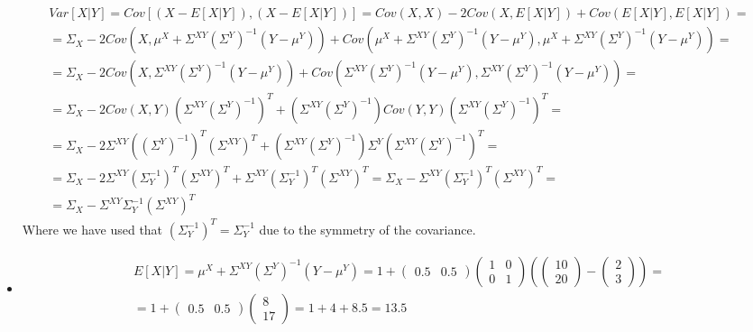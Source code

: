 \begin{itemize}
\begin{gather*}
        Var[X|Y] = Cov[(X-E[X|Y]),(X-E[X|Y])]=Cov(X,X)-2Cov(X,E[X|Y])+Cov(E[X|Y],E[X|Y])=\\
        =\Sigma_{X}-2Cov(X,\mu^{X}+\Sigma^{XY}(\Sigma^{Y})^{-1}(Y-\mu^{Y}))+Cov(\mu^{X}+\Sigma^{XY}(\Sigma^{Y})^{-1}(Y-\mu^{Y}),\mu^{X}+\Sigma^{XY}(\Sigma^{Y})^{-1}(Y-\mu^{Y}))=\\
        =\Sigma_{X}-2Cov(X,\Sigma^{XY}(\Sigma^{Y})^{-1}(Y-\mu^{Y}))+Cov(\Sigma^{XY}(\Sigma^{Y})^{-1}(Y-\mu^{Y}),\Sigma^{XY}(\Sigma^{Y})^{-1}(Y-\mu^{Y}))=\\
        =\Sigma_{X}-2Cov(X,Y)(\Sigma^{XY}(\Sigma^{Y})^{-1})^{T}+(\Sigma^{XY}(\Sigma^{Y})^{-1})Cov(Y,Y)(\Sigma^{XY}(\Sigma^{Y})^{-1})^{T}=\\
        =\Sigma_{X}-2\Sigma^{XY}((\Sigma^{Y})^{-1})^{T}(\Sigma^{XY})^{T}+(\Sigma^{XY}(\Sigma^{Y})^{-1})\Sigma^{Y}(\Sigma^{XY}(\Sigma^{Y})^{-1})^{T}=\\
        =\Sigma_{X}-2\Sigma^{XY}(\Sigma_{Y}^{-1})^{T}(\Sigma^{XY})^{T}+\Sigma^{XY}(\Sigma_{Y}^{-1})^{T}(\Sigma^{XY})^{T}=\Sigma_{X}-\Sigma^{XY}(\Sigma_{Y}^{-1})^{T}(\Sigma^{XY})^{T}=\\
        =\Sigma_{X}-\Sigma^{XY}\Sigma_{Y}^{-1}(\Sigma^{XY})^{T}
    \end{gather*}
    Where we have used that $(\Sigma_{Y}^{-1})^{T}=\Sigma_{Y}^{-1}$ due to the symmetry of the covariance.
    \newpage 
    \item
    \begin{gather*}
        E[X|Y]= \mu^{X}+\Sigma^{XY}(\Sigma^{Y})^{-1}(Y-\mu^{Y})=1+\begin{pmatrix} 0.5 & 0.5 \end{pmatrix}\begin{pmatrix} 1 & 0\\0 & 1 \end{pmatrix}(\begin{pmatrix} 10\\20 \end{pmatrix}-\begin{pmatrix} 2 \\ 3\end{pmatrix})=\\
        =1+\begin{pmatrix} 0.5 & 0.5 \end{pmatrix}\begin{pmatrix} 8 \\ 17 \end{pmatrix}=1+4+8.5=13.5
    \end{gather*}
    \begin{gather*}

\end{gather*}
\end{itemize}
